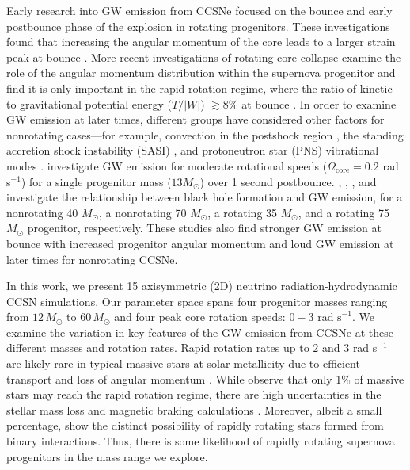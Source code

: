 \documentclass[twocolumn,times]{aastex62}  %
\begin{document}
Early research into GW emission from CCSNe focused on the bounce and early postbounce phase of the explosion in rotating progenitors.
These investigations found that increasing the angular momentum of the core leads to a larger strain peak at bounce \citep{muller:1982,moench:1991,yamada:1995,zwerger:1997,dimm:2002,kotake:2003,shibata:2004}.  
More recent investigations of rotating core collapse examine the role of the angular momentum distribution within the supernova progenitor and find it is only important in the rapid rotation regime, where the ratio of kinetic to gravitational potential energy ($T/|W|$) $ \gtrsim 8\%$ at bounce \citep{abdik:2014}. In order to examine GW emission at later times, different groups have considered other factors for nonrotating cases---for example, convection in the postshock region \citep{burrows:1996,muller:1997,muller:2004,marek:2009b,murphy:2009}, the standing accretion shock instability (SASI) \citep{blondin:2003,blondin:2006,ohnishi:2006,foglizzo:2007,scheck:2008,iwakami:2009,fernandez:2010}, and protoneutron star (PNS) vibrational modes \citep{cerda-duran:2013,torres-forne:2018,torres-forne:2019}.  \citet{moro:2018} investigate GW emission for moderate rotational speeds ($\Omega_{\mathrm{core}} = 0.2$ rad s$^{-1}$) for a single progenitor mass ($13 M_\odot$) over 1 second postbounce.  \citet{pan:2018}, \citet{kuroda:2018}, \citet{cerda-duran:2013}, and \citet{ott:2011} investigate the relationship between black hole formation and GW emission, for a nonrotating 40 $M_\odot$, a nonrotating  70 $M_\odot$, a rotating 35 $M_\odot$, and a rotating 75 $M_\odot$ progenitor, respectively.  These studies also find stronger GW emission at bounce with increased progenitor angular momentum and loud GW emission at later times for nonrotating CCSNe.
 

In this work, we present 15 axisymmetric (2D) neutrino radiation-hydrodynamic CCSN simulations.  
Our parameter space spans four progenitor masses ranging from $12\,M_\odot$ to $60\,M_\odot$ \citep{Suk:2016} and four peak core rotation speeds: $0-3 \text{ rad s}^{-1}$.  
We examine the variation in key features of the GW emission from CCSNe at these different masses and rotation rates.
Rapid rotation rates up to 2 and 3 rad s$^{-1}$ are likely rare in typical massive stars at solar metallicity due to efficient transport and loss of angular momentum \citep{heger:2005}.
While \citet{woosley:2006} observe that only 1\% of massive stars may reach the rapid rotation regime, there are high uncertainties in the stellar mass loss and magnetic braking calculations \citep{smith:2014}.  Moreover, albeit a small percentage, \citet{demink:2013} show the distinct possibility of rapidly rotating stars formed from binary interactions. Thus, there is some likelihood of rapidly rotating supernova progenitors in the mass range we explore.  
\end{document}
